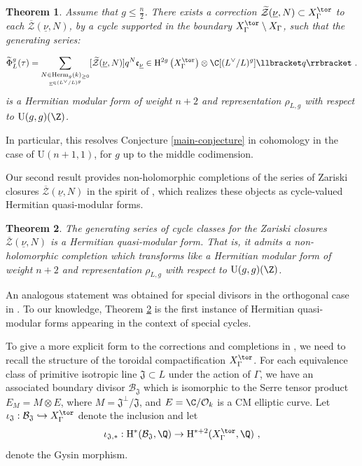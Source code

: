\documentclass[11pt,letterpaper,english]{amsart}
\numberwithin{equation}{subsection}
\numberwithin{equation}{section}
\newcommand\cB{{\mathcal B}}
\newcommand\cO{{\mathcal O}}
\newcommand\cZ{{\mathcal Z}}
\newcommand\fJ{{\mathfrak J}}
\theoremstyle{plain}
\newtheorem{theorem}{Theorem}[section]
\theoremstyle{remark}
\begin{document}
\begin{theorem}\label{t:main-inexplicit-form}
Assume that $g\leq\frac{n}{2}$. There exists a correction $\widetilde{\cZ}(\underline{\nu},N)\subset X^\tor_\Gamma$ to each $ \overline{\cZ}(\underline{\nu},N)$, by a cycle supported in the boundary $X^\tor_\Gamma\setminus X_\Gamma$, such that the generating series: 

\[\widetilde{\Phi}_L^g(\tau) = \sum_{\underset{\underline{\nu}\in (L^\vee/L)^g}{N\in \mathrm{Herm}_{g}(k)_{\geq 0}}} [\widetilde{\cZ}(\underline{\nu},N)] q^N \mathfrak e_{\underline\nu}\in \mathrm{H}^{2g}\left(X^\tor_\Gamma \right)\otimes \C[(L^\vee/L)^g] \llbracket q \rrbracket~.\]
is a Hermitian modular form of weight $n+2$ and representation $\rho_{L,g}$ with respect to
$\mathrm{U}(g,g)(\Z)$.  
\end{theorem}

In particular, this resolves Conjecture \ref{main-conjecture} in cohomology in the case of $\mathrm{U}(n+1,1)$, for $g$ up to the middle codimension.
\medskip 


Our second result provides non-holomorphic completions of the series of Zariski closures $\overline{\cZ}(\underline{\nu},N)$ in the spirit of \cite{engel-greer-tayou}, which realizes these objects as cycle-valued Hermitian quasi-modular forms.

\begin{theorem}\label{main-completion}
    The generating series of cycle classes for the Zariski closures $\overline{\cZ}(\underline{\nu},N)$ is a Hermitian quasi-modular form. That is, it admits a non-holomorphic completion which transforms like a Hermitian modular form of weight $n+2$ and representation $\rho_{L,g}$ with respect to
$\mathrm{U}(g,g)(\Z)$.
\end{theorem}


An analogous statement was obtained for special divisors in the orthogonal case in \cite{engel-greer-tayou}. To our knowledge, Theorem \ref{main-completion} is the first instance of Hermitian quasi-modular forms appearing in the context of special cycles.
\medskip

To give a more explicit form to the corrections and completions in , we need to recall the structure of the toroidal compactification $X_\Gamma^\tor$. For each equivalence class of primitive isotropic line $\mathfrak J\subset L$ under the action of $\Gamma$, we have an associated boundary divisor $\cB_{\mathfrak J}$ which is isomorphic to the Serre tensor product $E_M = M\otimes E$, where $M=\mathfrak{J}^\bot/\mathfrak{J}$, and $E=\C/\cO_k$ is a CM elliptic curve. Let $\iota_\fJ:\cB_\fJ\hookrightarrow X_\Gamma^{\tor}$ denote the inclusion and let 
\[\iota_{\fJ,*}:\mathrm{H}^*(\cB_\fJ,\Q)\rightarrow \mathrm{H}^{*+2}(X_\Gamma^{\tor},\Q)~,\]
denote the Gysin morphism.
\end{document}
